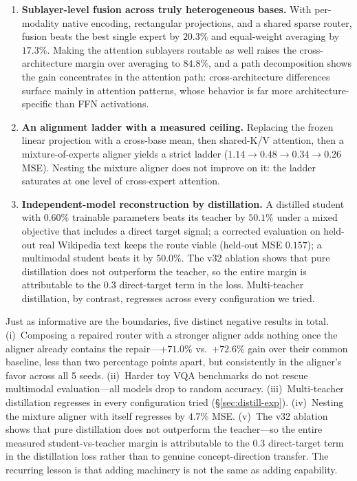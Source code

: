 \documentclass[10pt,twoside]{article}
\theoremstyle{definition}
\begin{document}
\begin{enumerate}
    \item \textbf{Sublayer-level fusion across truly heterogeneous bases.} With per-modality native encoding, rectangular projections, and a shared sparse router, fusion beats the best single expert by $20.3\%$ and equal-weight averaging by $17.3\%$. Making the attention sublayers routable as well raises the cross-architecture margin over averaging to $84.8\%$, and a path decomposition shows the gain concentrates in the attention path: cross-architecture differences surface mainly in attention patterns, whose behavior is far more architecture-specific than FFN activations.
    \item \textbf{An alignment ladder with a measured ceiling.} Replacing the frozen linear projection with a cross-base mean, then shared-K/V attention, then a mixture-of-experts aligner yields a strict ladder ($1.14 \rightarrow 0.48 \rightarrow 0.34 \rightarrow 0.26$ MSE). Nesting the mixture aligner does not improve on it: the ladder saturates at one level of cross-expert attention.
    \item \textbf{Independent-model reconstruction by distillation.} A distilled student with $0.60\%$ trainable parameters beats its teacher by $50.1\%$ under a mixed objective that includes a direct target signal; a corrected evaluation on held-out real Wikipedia text keeps the route viable (held-out MSE $0.157$); a multimodal student beats it by $50.0\%$. The v32 ablation shows that pure distillation does not outperform the teacher, so the entire margin is attributable to the $0.3$ direct-target term in the loss. Multi-teacher distillation, by contrast, regresses across every configuration we tried.
\end{enumerate}

Just as informative are the boundaries, five distinct negative results in total. (i)~Composing a repaired router with a stronger aligner adds nothing once the aligner already contains the repair---$+71.0\%$ vs.\ $+72.6\%$ gain over their common baseline, less than two percentage points apart, but consistently in the aligner's favor across all 5 seeds. (ii)~Harder toy VQA benchmarks do not rescue multimodal evaluation---all models drop to random accuracy. (iii)~Multi-teacher distillation regresses in every configuration tried (\S\ref{sec:distill-exp}). (iv)~Nesting the mixture aligner with itself regresses by $4.7\%$ MSE. (v)~The v32 ablation shows that pure distillation does not outperform the teacher---so the entire measured student-vs-teacher margin is attributable to the $0.3$ direct-target term in the distillation loss rather than to genuine concept-direction transfer. The recurring lesson is that adding machinery is not the same as adding capability.
\end{document}
